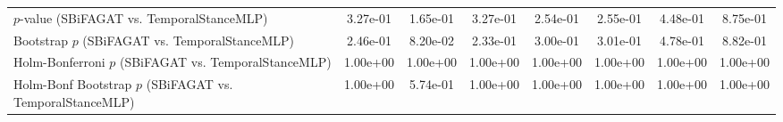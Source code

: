 \begin{table}[t]
{\begin{tabular}{lccccccc}
\midrule
$p$-value (SBiFAGAT vs. TemporalStanceMLP) & 3.27e-01 & 1.65e-01 & 3.27e-01 & 2.54e-01 & 2.55e-01 & 4.48e-01 & 8.75e-01 \\
Bootstrap $p$ (SBiFAGAT vs. TemporalStanceMLP) & 2.46e-01 & 8.20e-02 & 2.33e-01 & 3.00e-01 & 3.01e-01 & 4.78e-01 & 8.82e-01 \\
Holm-Bonferroni $p$ (SBiFAGAT vs. TemporalStanceMLP) & 1.00e+00 & 1.00e+00 & 1.00e+00 & 1.00e+00 & 1.00e+00 & 1.00e+00 & 1.00e+00 \\
Holm-Bonf Bootstrap $p$ (SBiFAGAT vs. TemporalStanceMLP) & 1.00e+00 & 5.74e-01 & 1.00e+00 & 1.00e+00 & 1.00e+00 & 1.00e+00 & 1.00e+00 \\
\bottomrule
\end{tabular}
}
\end{table}
